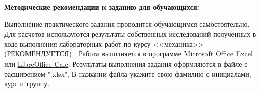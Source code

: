 \textbf{Методические рекомендации к заданию для обучающихся:} 

Выполнение практического задания проводится обучающимся
самостоятельно. Для расчетов используются результаты собственных
исследований полученных в ходе выполнения лабораторных работ по курсу <<механика>> (РЕКОМЕНДУЕТСЯ)
. 
Работа выполняется в программе \href{https://mega.nz/folder/0EUyAKgC#4X5RubnYkoUUJYhwDDpKbg}{Microsoft Office Excel} или \href{https://www.libreoffice.org/download/download-libreoffice/?type=win-x86_64&version=7.4.0&lang=ru-RU}{LibreOffice Calc}. Результаты выполнения задания оформляются в файле с расширением ".xlsx". В названии файла укажите свою фамилию с инициалами, курс и группу.